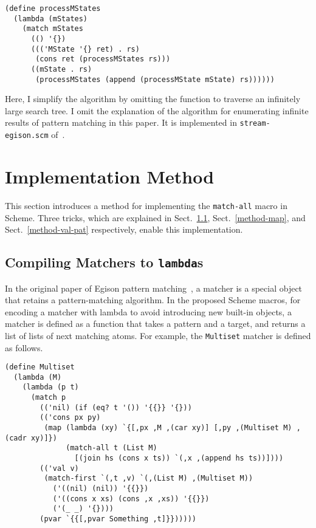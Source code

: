\documentclass[acmlarge]{acmart}
\begin{document}
\begin{lstlisting}[language=egison]
(define processMStates
  (lambda (mStates)
    (match mStates
      (() '{})
      ((('MState '{} ret) . rs)
       (cons ret (processMStates rs)))
      ((mState . rs)
       (processMStates (append (processMState mState) rs))))))
\end{lstlisting}

Here, I simplify the algorithm by omitting the function to traverse an infinitely large search tree.
I omit the explanation of the algorithm for enumerating infinite results of pattern matching in this paper.
It is implemented in \texttt{stream-egison.scm} of~\cite{egisonScheme}.


\section{Implementation Method}\label{method}

This section introduces a method for implementing the \texttt{match-all} macro in Scheme.
Three tricks, which are explained in Sect.~\ref{method-matcher}, Sect.~\ref{method-map}, and Sect.~\ref{method-val-pat} respectively, enable this implementation.

\subsection{Compiling Matchers to \texttt{lambda}s}\label{method-matcher}

In the original paper of Egison pattern matching~\cite{egi2018aplas}, a matcher is a special object that retains a pattern-matching algorithm.
In the proposed Scheme macros, for encoding a matcher with lambda to avoid introducing new built-in objects, a matcher is defined as a function that takes a pattern and a target, and returns a list of lists of next matching atoms.
For example, the \texttt{Multiset} matcher is defined as follows.

\begin{lstlisting}[language=egison]
(define Multiset
  (lambda (M)
    (lambda (p t)
      (match p
        (('nil) (if (eq? t '()) '{{}} '{}))
        (('cons px py)
         (map (lambda (xy) `{[,px ,M ,(car xy)] [,py ,(Multiset M) ,(cadr xy)]})
              (match-all t (List M)
                [(join hs (cons x ts)) `(,x ,(append hs ts))])))
        (('val v)
         (match-first `(,t ,v) `(,(List M) ,(Multiset M))
           ('((nil) (nil)) '{{}})
           ('((cons x xs) (cons ,x ,xs)) '{{}})
           ('(_ _) '{})))
        (pvar `{{[,pvar Something ,t]}})))))
\end{lstlisting}
\end{document}
